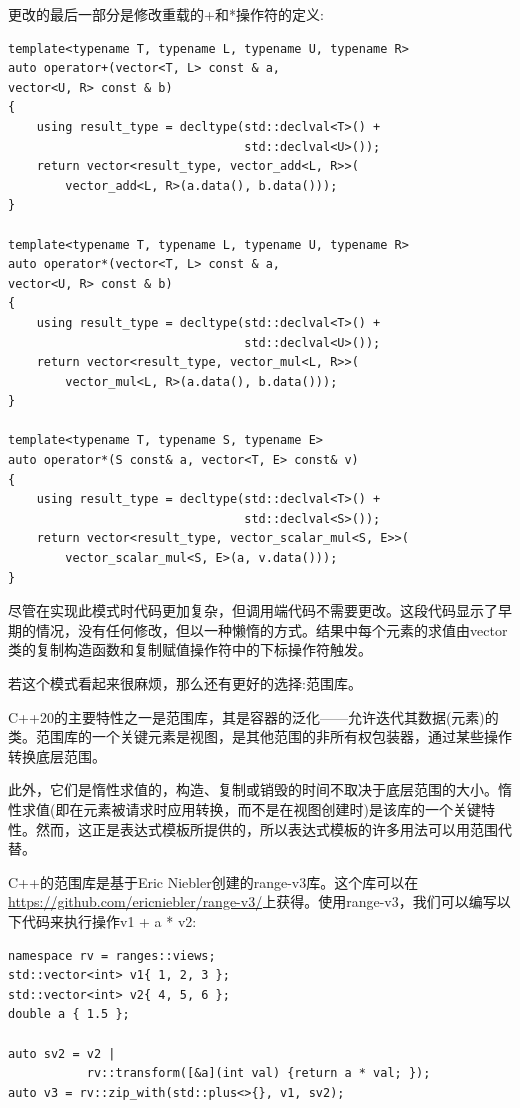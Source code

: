 更改的最后一部分是修改重载的+和*操作符的定义:

\begin{lstlisting}[style=styleCXX]
template<typename T, typename L, typename U, typename R>
auto operator+(vector<T, L> const & a,
vector<U, R> const & b)
{
	using result_type = decltype(std::declval<T>() +
								 std::declval<U>());
	return vector<result_type, vector_add<L, R>>(
		vector_add<L, R>(a.data(), b.data()));
}

template<typename T, typename L, typename U, typename R>
auto operator*(vector<T, L> const & a,
vector<U, R> const & b)
{
	using result_type = decltype(std::declval<T>() +
								 std::declval<U>());
	return vector<result_type, vector_mul<L, R>>(
		vector_mul<L, R>(a.data(), b.data()));
}

template<typename T, typename S, typename E>
auto operator*(S const& a, vector<T, E> const& v)
{
	using result_type = decltype(std::declval<T>() +
								 std::declval<S>());
	return vector<result_type, vector_scalar_mul<S, E>>(
		vector_scalar_mul<S, E>(a, v.data()));
}
\end{lstlisting}

尽管在实现此模式时代码更加复杂，但调用端代码不需要更改。这段代码显示了早期的情况，没有任何修改，但以一种懒惰的方式。结果中每个元素的求值由vector类的复制构造函数和复制赋值操作符中的下标操作符触发。

若这个模式看起来很麻烦，那么还有更好的选择:范围库。


C++20的主要特性之一是范围库，其是容器的泛化——允许迭代其数据(元素)的类。范围库的一个关键元素是视图，是其他范围的非所有权包装器，通过某些操作转换底层范围。

此外，它们是惰性求值的，构造、复制或销毁的时间不取决于底层范围的大小。惰性求值(即在元素被请求时应用转换，而不是在视图创建时)是该库的一个关键特性。然而，这正是表达式模板所提供的，所以表达式模板的许多用法可以用范围代替。

C++的范围库是基于Eric Niebler创建的range-v3库。这个库可以在\url{https://github.com/ericniebler/range-v3/}上获得。使用range-v3，我们可以编写以下代码来执行操作v1 + a * v2:

\begin{lstlisting}[style=styleCXX]
namespace rv = ranges::views;
std::vector<int> v1{ 1, 2, 3 };
std::vector<int> v2{ 4, 5, 6 };
double a { 1.5 };

auto sv2 = v2 |
		   rv::transform([&a](int val) {return a * val; });
auto v3 = rv::zip_with(std::plus<>{}, v1, sv2);
\end{lstlisting}


